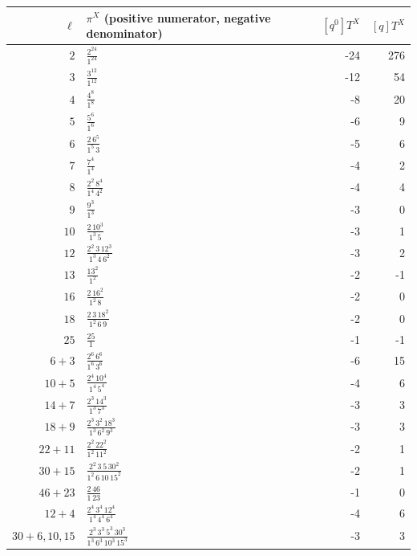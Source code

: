 \begin{longtable}{r|l|r|r}
$\ell$ & $\pi^X$ (positive numerator, negative denominator) & $[q^0]T^X$ & $[q]T^X$\\\hline
$2$ & $\frac{2^{24}}{1^{24}}$ & -24 & 276\\
$3$ & $\frac{3^{12}}{1^{12}}$ & -12 & 54\\
$4$ & $\frac{4^{8}}{1^{8}}$ & -8 & 20\\
$5$ & $\frac{5^{6}}{1^{6}}$ & -6 & 9\\
$6$ & $\frac{2\,6^{5}}{1^{5}\,3}$ & -5 & 6\\
$7$ & $\frac{7^{4}}{1^{4}}$ & -4 & 2\\
$8$ & $\frac{2^{2}\,8^{4}}{1^{4}\,4^{2}}$ & -4 & 4\\
$9$ & $\frac{9^{3}}{1^{3}}$ & -3 & 0\\
$10$ & $\frac{2\,10^{3}}{1^{3}\,5}$ & -3 & 1\\
$12$ & $\frac{2^{2}\,3\,12^{3}}{1^{3}\,4\,6^{2}}$ & -3 & 2\\
$13$ & $\frac{13^{2}}{1^{2}}$ & -2 & -1\\
$16$ & $\frac{2\,16^{2}}{1^{2}\,8}$ & -2 & 0\\
$18$ & $\frac{2\,3\,18^{2}}{1^{2}\,6\,9}$ & -2 & 0\\
$25$ & $\frac{25}{1}$ & -1 & -1\\
$6+3$ & $\frac{2^{6}\,6^{6}}{1^{6}\,3^{6}}$ & -6 & 15\\
$10+5$ & $\frac{2^{4}\,10^{4}}{1^{4}\,5^{4}}$ & -4 & 6\\
$14+7$ & $\frac{2^{3}\,14^{3}}{1^{3}\,7^{3}}$ & -3 & 3\\
$18+9$ & $\frac{2^{3}\,3^{2}\,18^{3}}{1^{3}\,6^{2}\,9^{3}}$ & -3 & 3\\
$22+11$ & $\frac{2^{2}\,22^{2}}{1^{2}\,11^{2}}$ & -2 & 1\\
$30+15$ & $\frac{2^{2}\,3\,5\,30^{2}}{1^{2}\,6\,10\,15^{2}}$ & -2 & 1\\
$46+23$ & $\frac{2\,46}{1\,23}$ & -1 & 0\\
$12+4$ & $\frac{2^{4}\,3^{4}\,12^{4}}{1^{4}\,4^{4}\,6^{4}}$ & -4 & 6\\
$30+6,10,15$ & $\frac{2^{3}\,3^{3}\,5^{3}\,30^{3}}{1^{3}\,6^{3}\,10^{3}\,15^{3}}$ & -3 & 3\\
\end{longtable}
